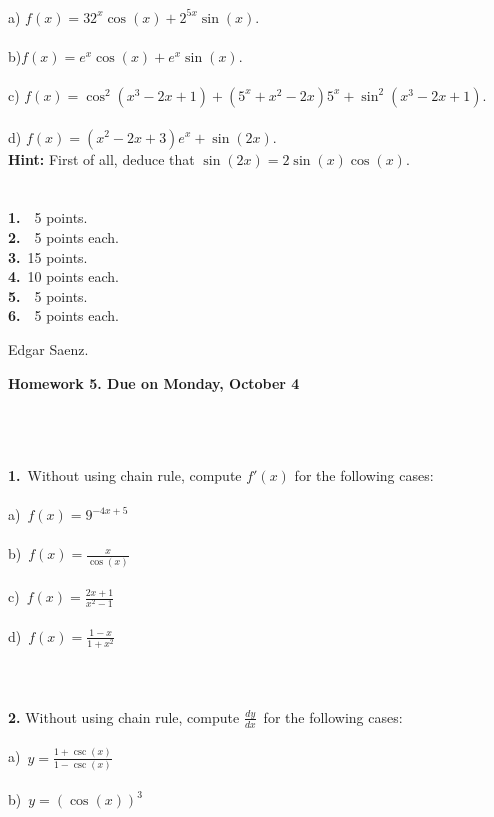 \documentclass[12pt]{article}
\newcommand{\Frac}{\displaystyle \frac}
\begin{document}
\\
a) $f(x)=32^{x}\cos(x)+2^{5x}\sin(x)$.\\
\\
b)$f(x)=e^{x}\cos(x)+e^{x}\sin(x).$\\
\\
c) $f(x)=\cos^{2}(x^{3}-2x+1)+(5^{x}+x^{2}-2x)5^{x}+\sin^{2}(x^{3}-2x+1)$.\\
\\
d) $f(x)=(x^{2}-2x+3)e^{x}+\sin(2x)$.\\
\textbf{Hint:} First of all, deduce that $\sin(2x)=2\sin(x)\cos(x)$.\\
\\
\\
\textbf{1.}\ \ 5 points.\\
\textbf{2.}\ \ 5 points each.\\
\textbf{3.}\ 15 points.\\
\textbf{4.}\ 10 points each.\\
\textbf{5.}\ \ 5 points.\\
\textbf{6.}\ \ 5 points each.\\
\begin{flushright}
Edgar Saenz.
\end{flushright}
\newpage
\begin{center}
\textbf{Homework 5. Due on Monday, October 4}
\end{center}\
\\\\\\
\textbf{1.}\ Without using chain rule, compute $f'(x)$ for the following cases:\\
\\
a)\ $f(x)= 9^{-4x+5}$\\
\\
b)\ $f(x)= \Frac{x}{\cos(x)}$\\
\\
c)\ $f(x)=\Frac{2x+1}{x^{2}-1}$\\
\\
d)\ $f(x)=\Frac{1-x}{1+x^{2}}$\\\\\\\\
\textbf{2.} Without using chain rule, compute $\Frac{dy}{dx}$\  for the following cases:\\
\\
a)\ $y= \Frac{1+\csc(x)}{1-\csc(x)}$\\
\\
b)\ $y= (\cos(x))^{3}$\\
\end{document}
